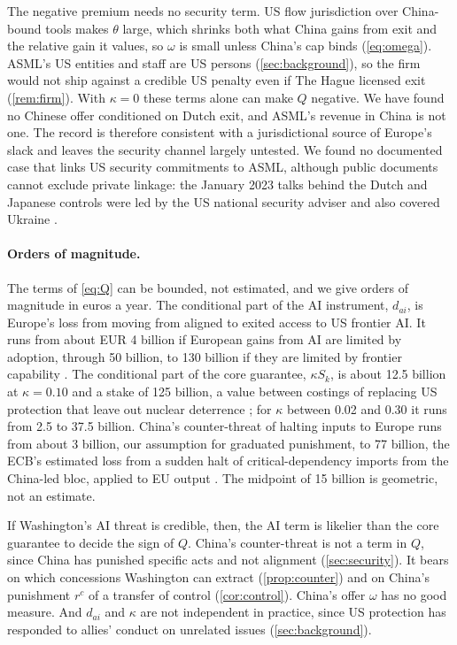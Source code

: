 The negative premium needs no security term. US flow jurisdiction over China-bound tools makes $\theta$ large, which shrinks both what China gains from exit and the relative gain it values, so $\omega$ is small unless China's cap binds (\cref{eq:omega}). ASML's US entities and staff are US persons (\cref{sec:background}), so the firm would not ship against a credible US penalty even if The Hague licensed exit (\cref{rem:firm}). With $\kappa=0$ these terms alone can make $Q$ negative. We have found no Chinese offer conditioned on Dutch exit, and ASML's revenue in China is not one. The record is therefore consistent with a jurisdictional source of Europe's slack and leaves the security channel largely untested. We found no documented case that links US security commitments to ASML, although public documents cannot exclude private linkage: the January 2023 talks behind the Dutch and Japanese controls were led by the US national security adviser and also covered Ukraine \citep{durbin2023biden}.

\paragraph{Orders of magnitude.} The terms of \cref{eq:Q} can be bounded, not estimated, and we give orders of magnitude in euros a year. The conditional part of the AI instrument, $d_{ai}$, is Europe's loss from moving from aligned to exited access to US frontier AI. It runs from about EUR 4 billion if European gains from AI are limited by adoption, through 50 billion, to 130 billion if they are limited by frontier capability \citep{acemoglu2024simple, filippucci2025g7, epoch2026eci}. The conditional part of the core guarantee, $\kappa S_k$, is about 12.5 billion at $\kappa=0.10$ and a stake of 125 billion, a value between costings of replacing US protection that leave out nuclear deterrence \citep{iiss2025defending, burilkov2025defending}; for $\kappa$ between 0.02 and 0.30 it runs from 2.5 to 37.5 billion. China's counter-threat of halting inputs to Europe runs from about 3 billion, our assumption for graduated punishment, to 77 billion, the ECB's estimated loss from a sudden halt of critical-dependency imports from the China-led bloc, applied to EU output \citep{attinasi2025hidden}. The midpoint of 15 billion is geometric, not an estimate.

If Washington's AI threat is credible, then, the AI term is likelier than the core guarantee to decide the sign of $Q$. China's counter-threat is not a term in $Q$, since China has punished specific acts and not alignment (\cref{sec:security}). It bears on which concessions Washington can extract (\cref{prop:counter}) and on China's punishment $r^c$ of a transfer of control (\cref{cor:control}). China's offer $\omega$ has no good measure. And $d_{ai}$ and $\kappa$ are not independent in practice, since US protection has responded to allies' conduct on unrelated issues (\cref{sec:background}).

